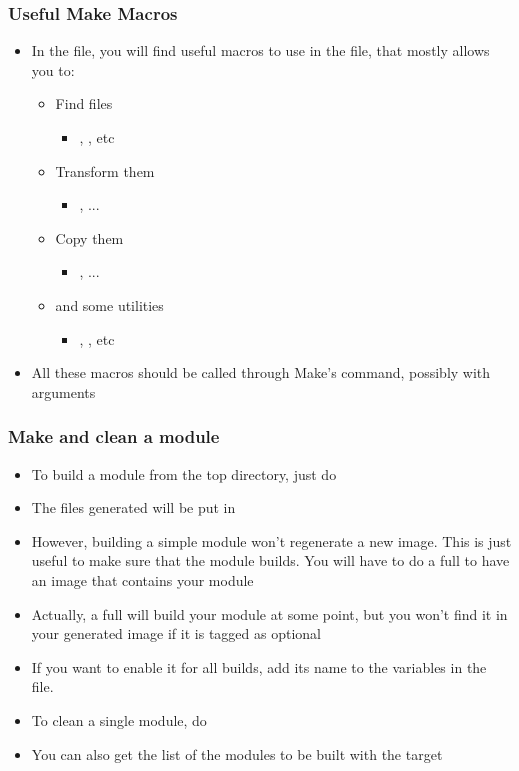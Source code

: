 \begin{frame}
  \frametitle{Useful Make Macros}
  \begin{itemize}
  \item In the  file, you will find
    useful macros to use in the  file, that mostly
    allows you to:
    \begin{itemize}
    \item Find files
      \begin{itemize}
      \item {}, , etc
      \end{itemize}
    \item Transform them
      \begin{itemize}
      \item {}, ...
      \end{itemize}
    \item Copy them
      \begin{itemize}
      \item {}, ...
      \end{itemize}
    \item and some utilities
      \begin{itemize}
      \item {}, , etc
      \end{itemize}
    \end{itemize}
  \item All these macros should be called through Make's  command,
    possibly with arguments
  \end{itemize}
\end{frame}

\begin{frame}
  \frametitle{Make and clean a module}
  \begin{itemize}
  \item To build a module from the top directory, just do
  \item The files generated will be put in
  \item However, building a simple module won't regenerate a new image.
    This is just useful to make sure that the module builds.
    You will have to do a full  to have an image that contains
    your module
  \item Actually, a full  will build your module at some
    point, but you won't find it in your generated image if it is
    tagged as optional
  \item If you want to enable it for all builds, add its name to the
     variables in the
     file.
  \item To clean a single module, do 
  \item You can also get the list of the modules to be built with the
     target
  \end{itemize}
\end{frame}

